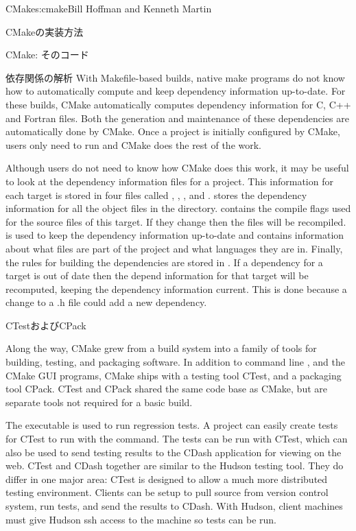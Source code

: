 \begin{aosachapter}{CMake}{s:cmake}{Bill Hoffman and Kenneth Martin}
\begin{aosasect1}{CMakeの実装方法}
\begin{aosasect2}{CMake: そのコード}
\begin{aosasect3}{依存関係の解析}
With Makefile-based builds, native make programs do not know how to
automatically compute and keep dependency information up-to-date. For
these builds, CMake automatically computes dependency information for
C, C++ and Fortran files. Both the generation and maintenance of these
dependencies are automatically done by CMake. Once a project is
initially configured by CMake, users only need to run  and
CMake does the rest of the work.

Although users do not need to know how CMake does this work, it may be
useful to look at the dependency information files for a project. This
information for each target is stored in four files called
, , , and
.   stores the dependency
information for all the object files in the directory.
 contains the compile flags used for the source files
of this target. If they change then the files will be recompiled.
 is used to keep the dependency information
up-to-date and contains information about what files are part of the
project and what languages they are in. Finally, the rules for
building the dependencies are stored in . If a
dependency for a target is out of date then the depend information
for that target will be recomputed, keeping the dependency information
current. This is done because a change to a .h file could add a new
dependency.

\end{aosasect3}

\begin{aosasect3}{CTestおよびCPack}

Along the way, CMake grew from a build system into
a family of tools for building, testing, and packaging
software. In addition to command line , and the CMake GUI
programs, CMake ships with a testing tool CTest, and a packaging tool
CPack. CTest and CPack shared the same code base as CMake, but are
separate tools not required for a basic build.

The  executable is used to run regression tests. A project
can easily create tests for CTest to run with the 
command. The tests can be run with CTest, which can also be used to
send testing results to the CDash application for viewing on the web.
CTest and CDash together are similar to the Hudson testing tool. They
do differ in one major area: CTest is designed to allow a much more
distributed testing environment.  Clients can be setup to pull source
from version control system, run tests, and send the results to
CDash. With Hudson, client machines must give Hudson ssh access to the
machine so tests can be run.


\end{aosasect3}
\end{aosasect2}
\end{aosasect1}
\end{aosachapter}
